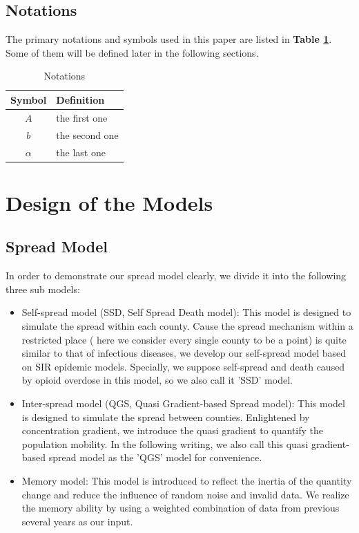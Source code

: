 \documentclass[12pt]{article}
\begin{document}
\subsection{Notations}
The primary notations and symbols used in this paper are listed in \textbf{Table \ref{tb:notation}}. Some of them will be defined later in the following sections.
\begin{table}[!htbp]
\begin{center}
\caption{Notations}
\begin{tabular}{cl}
	\toprule
	\multicolumn{1}{m{3cm}}{\centering Symbol}
	&\multicolumn{1}{m{8cm}}{\centering Definition}\\
	\midrule
	$A$&the first one\\
	$b$&the second one\\
	$\alpha$ &the last one\\
	\bottomrule
\end{tabular}\label{tb:notation}
\end{center}
\end{table}


\section{Design of the Models}
\subsection{Spread Model}
In order to demonstrate our spread model clearly, we divide it into the following three sub models:
\begin{itemize}
	\item Self-spread model (SSD, Self Spread Death model): This model is designed to simulate the spread within each county. Cause the spread mechanism within a restricted place ( here we consider every single county to be a point) is quite similar to that of infectious diseases, we develop our self-spread model based on SIR epidemic models. Specially, we suppose self-spread and death caused by opioid overdose in this model, so we also call it 'SSD' model.
	\item Inter-spread model (QGS, Quasi Gradient-based Spread model): This model is designed to simulate the spread between counties. Enlightened by concentration gradient, we introduce the quasi gradient to quantify the population mobility. In the following writing, we also call this quasi gradient-based spread model as the 'QGS' model for convenience.
	\item Memory model: This model is introduced to reflect the inertia of the quantity change and reduce the influence of random noise and invalid data. We realize the memory ability by using a weighted combination of data from previous several years as our input.
\end{itemize}
\end{document}
